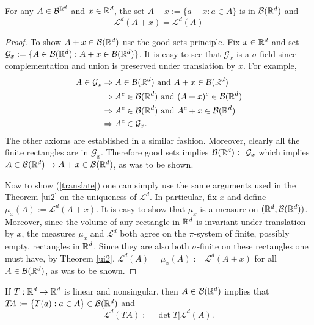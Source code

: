 \begin{theorem}
For any $A\in\mathcal  B^{\Bbb R^d}$ and $x\in \Bbb R^d$, the set $A+x:= \{ a+x: a\in A\}$ is in $\mathcal B(\Bbb R^d)$ and
\begin{equation}
 \label{translate}
 \mathcal L^d(A+x) =  \mathcal L^d(A)
 \end{equation}
\end{theorem}
\begin{proof}
To show $A+x \in\mathcal B(\Bbb R^d)$ use the good sets principle. Fix $x\in \Bbb R^d$ and set   $\mathcal G_x:=\{ A\in \mathcal B(\Bbb R^d):  A+x \in \mathcal B(\Bbb R^d)\}$.
It is easy to see that $\mathcal G_x$ is a $\sigma$-field since complementation and union is preserved under translation by $x$. For example,
\begin{align*}
A\in\mathcal G_x &\Rightarrow  A\in \mathcal B(\Bbb R^d) \text{  and } A+x \in \mathcal B(\Bbb R^d) \\
&\Rightarrow  A^c\in \mathcal B(\Bbb R^d) \text{  and } (A+x)^c \in \mathcal B(\Bbb R^d) \\
&\Rightarrow  A^c\in \mathcal B(\Bbb R^d) \text{  and } A^c+x \in \mathcal B(\Bbb R^d) \\
&\Rightarrow A^c\in\mathcal G_x.
\end{align*}
The other axioms are established in a similar fashion.
Moreover, clearly all the finite rectangles are in $\mathcal G_x$. Therefore good sets implies $\mathcal B(\Bbb R^d) \subset \mathcal G_x$  which implies $A\in \mathcal B(\Bbb R^d)\rightarrow A+x \in \mathcal B(\Bbb R^d)$, as was to be shown.

Now to show (\ref{translate}) one can simply use the same arguments used in the Theorem \ref{ui2} on the uniqueness of $\mathcal L^d$. In particular, fix $x$ and define $\mu_x(A):= \mathcal L^d(A+x)$. It is easy to show that $\mu_x$ is a measure on $(\Bbb R^d, \mathcal B(\Bbb R^d))$. Moreover, since the volume of any rectangle in $\Bbb R^d$ is invariant under translation by $x$, the measures $\mu_x$ and $\mathcal L^d$ both agree on the $\pi$-system of finite, possibly empty, rectangles in $\Bbb R^d$. Since they are also both $\sigma$-finite on these rectangles one must have, by Theorem \ref{ui2}, $\mathcal L^d(A) =\mu_x(A):= \mathcal L^d(A+x) $ for all $A\in\mathcal B(\Bbb R^d)$, as was to be shown.
\end{proof}

\begin{theorem}
If $T:\Bbb R^d\rightarrow \Bbb R^d$ is linear and nonsingular, then $A\in\mathcal B(\Bbb R^d)$ implies that $T\!A:=\{ T(a): a\in A\}\in \mathcal B(\Bbb R^d)$ and
\[ \mathcal L^d(T\!A):=|\det T |\mathcal L^d(A). \]
\end{theorem}

